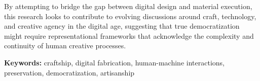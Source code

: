 \vspace{0.5cm}

By attempting to bridge the gap between digital design and material execution, this research looks to contribute to evolving discussions around craft, technology, and creative agency in the digital age, suggesting that true democratization might require representational frameworks that acknowledge the complexity and continuity of human creative processes.

\vspace{1cm}

\noindent
\textbf{Keywords:} craftship, digital fabrication, human-machine interactions, preservation, democratization, artisanship

\vspace{\fill}
